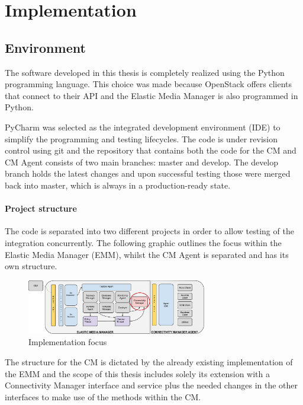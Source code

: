 \chapter{Implementation}



\section{Environment}

The software developed in this thesis is completely realized using the Python programming language. This choice was made because OpenStack offers clients that connect to their API and the Elastic Media Manager is also programmed in Python.

PyCharm was selected as the integrated development environment (IDE) to simplify the programming and testing lifecycles. The code is under revision control using git and the repository that contains both the code for the CM and CM Agent consists of two main branches: master and develop. The develop branch holds the latest changes and upon successful testing those were merged back into master, which is always in a production-ready state.


\subsubsection{Project structure}

The code is separated into two different projects in order to allow testing of the integration concurrently. The following graphic outlines the focus within the Elastic Media Manager (EMM), whilst the CM Agent is separated and has its own structure.

\begin{figure}[H]
\centering

\includegraphics[width=0.7\textwidth]{images/implementation/cm_implementation_focus_overview}

\caption{Implementation focus}
\end{figure}

The structure for the CM is dictated by the already existing implementation of the EMM and the scope of this thesis includes solely its extension with a Connectivity Manager interface and service plus the needed changes in the other interfaces to make use of the methods within the CM.

